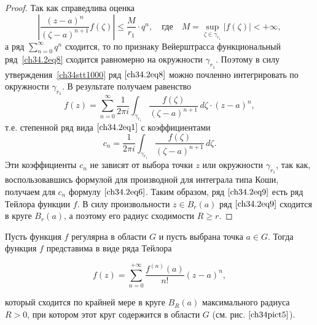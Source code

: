 \begin{proof}
Так как справедлива оценка
$$
\left| \frac{(z - a)^n}{(\zeta - a)^{n + 1}} f(\zeta) \right| \le \frac{M}{r_1} \cdot q^n, \quad \text{где} \quad M = \sup_{\zeta \in \gamma_{r_1}} |f(\zeta)| < +\infty,
$$
а ряд $\sum\limits_{n = 0}^{\infty} q^n$ сходится, то по признаку Вейерштрасса функциональный ряд~\eqref{ch34.2eq8} сходится равномерно на окружности $\gamma_{r_1}$. Поэтому в силу утверждения~\ref{ch34stt1000} ряд $\eqref{ch34.2eq8}$ можно почленно интегрировать по окружности $\gamma_{r_1}$. В результате получаем равенство
\begin{equation} \label{ch34.2eq9}
f(z) = \sum\limits_{n = 0}^{\infty} \frac{1}{2\pi i} \int_{\gamma_{r_1}} \frac{f(\zeta)}{(\zeta - a)^{n + 1}} \,d\zeta \cdot (z - a)^n,
\end{equation}
т.е. степенной ряд вида $\eqref{ch34.2eq1}$ с коэффициентами
\begin{equation} \label{ch34.2eq10}
c_n = \frac{1}{2\pi i} \int_{\gamma_{r_1}} \frac{f(\zeta)}{(\zeta - a)^{n + 1}} \,d\zeta.
\end{equation}
Эти коэффициенты $c_n$ не зависят от выбора точки $z$ или окружности $\gamma_{r_1}$, так как, воспользовавшись формулой для производной для интеграла типа Коши, получаем для $c_n$ формулу $\eqref{ch34.2eq6}$. Таким образом, ряд $\eqref{ch34.2eq9}$ есть ряд Тейлора функции $f$. В силу произвольности $z \in B_r(a)$ ряд $\eqref{ch34.2eq9}$ сходится в круге $B_r(a)$, а поэтому его радиус сходимости $R \ge r$.
\end{proof}

\begin{cons} \label{cons1}
Пусть функция $f$ регулярна в области $G$ и пусть выбрана точка $a \in G$. Тогда функция $f$ представима в виде ряда Тейлора 

 \label{ch34pict5}
$$
f(z) = \sum\limits_{n = 0}^{+\infty} \frac{f^{(n)}(a)}{n!} (z - a)^n,
$$

который сходится по крайней мере в круге $B_R(a)$ максимального радиуса $R > 0$, при котором этот круг содержится в области $G$ (см. рис. $\ref{ch34pict5}$).
\end{cons}